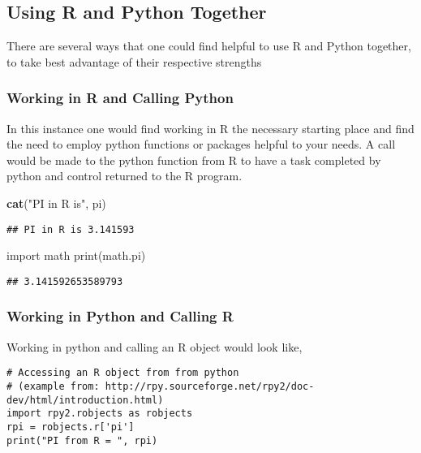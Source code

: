 \documentclass[]{book}
\newenvironment{Shaded}{\begin{snugshade}}{\end{snugshade}}
\newcommand{\KeywordTok}[1]{\textcolor[rgb]{0.13,0.29,0.53}{\textbf{#1}}}
\newcommand{\StringTok}[1]{\textcolor[rgb]{0.31,0.60,0.02}{#1}}
\newcommand{\ImportTok}[1]{#1}
\newcommand{\BuiltInTok}[1]{#1}
\newcommand{\NormalTok}[1]{#1}
\theoremstyle{definition}
\theoremstyle{definition}
\theoremstyle{definition}
\theoremstyle{remark}
\begin{document}
\subsection{Using R and Python
Together}\label{using-r-and-python-together}

There are several ways that one could find helpful to use R and Python
together, to take best advantage of their respective strengths

\subsubsection{Working in R and Calling
Python}\label{working-in-r-and-calling-python}

In this instance one would find working in R the necessary starting
place and find the need to employ python functions or packages helpful
to your needs. A call would be made to the python function from R to
have a task completed by python and control returned to the R program.

\begin{Shaded}
\begin{Highlighting}[]
\KeywordTok{cat}\NormalTok{(}\StringTok{"PI in R is"}\NormalTok{, pi)}
\end{Highlighting}
\end{Shaded}

\begin{verbatim}
## PI in R is 3.141593
\end{verbatim}

\begin{Shaded}
\begin{Highlighting}[]
\ImportTok{import}\NormalTok{ math}
\BuiltInTok{print}\NormalTok{(math.pi)}
\end{Highlighting}
\end{Shaded}

\begin{verbatim}
## 3.141592653589793
\end{verbatim}

\subsubsection{Working in Python and Calling
R}\label{working-in-python-and-calling-r}

Working in python and calling an R object would look like,

\begin{verbatim}
# Accessing an R object from from python 
# (example from: http://rpy.sourceforge.net/rpy2/doc-dev/html/introduction.html)
import rpy2.robjects as robjects
rpi = robjects.r['pi']
print("PI from R = ", rpi)
\end{verbatim}
\end{document}
